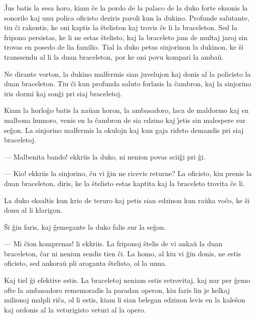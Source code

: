    \^Jus batis la sesa horo, kiam \^ce la pordo de la palaco de la duko
forte eksonis la sonorilo kaj unu polica oficisto deziris paroli kun
la dukino. Profunde salutante, tiu \^ci rakontis, ke oni kaptis la
\^steliston kaj trovis \^ce li la braceleton. Sed la fripono
persistas, ke li ne estas \^stelisto, kaj la braceleto jam de multaj
jaroj sin trovas en posedo de lia familio. Tial la duko petas
sinjorinon la dukinon, ke \^si transsendu al li la duan braceleton,
por ke oni povu kompari la amba\u u.

   Ne dirante vorton, la dukino malfermis sian juvelujon kaj donis al la
policisto la duan braceleton. Tiu \^ci kun profunda saluto forlasis
la \^cambron, kaj la sinjorino iris dormi kaj son\^gi pri siaj
braceletoj.

   Kiam la horlo\^go batis la na\u uan horon, la ambasadoro, laca de
maldormo kaj en malbona humoro, venis en la \^cambron de sia edzino
kaj \^{\j}etis sin malespere sur se\^gon. La sinjorino malfermis la
okulojn kaj kun gaja rideto demandis pri siaj braceletoj.

 --- Malbenita bando! ekkriis la duko, ni nenion povas scii\^gi pri \^gi.

 --- Kio! ekkriis la sinjorino, \^cu vi \^gin ne ricevis returne? La
oficisto, kiu prenis la duan braceleton, diris, ke la \^stelisto
estas kaptita kaj la braceleto trovita \^ce li.

   La duko eksaltis kun krio de teruro kaj petis sian edzinon kun ra\u uka
vo\^co, ke \^si donu al li klarigon.

   \^Si \^gin faris, kaj \^gemegante la duko falis sur la se\^gon.

 --- Mi \^cion komprenas! li ekkriis. La friponoj \^stelis de vi anka\u u
la duan braceleton, \^car ni neniun sendis tien \^ci. La homo, al
kiu vi \^gin donis, ne estis oficisto, sed ankora\u u pli aroganta
\^stelisto, ol la unua.

   Kaj tiel \^gi efektive estis. La braceletoj neniam estis retrovitaj,
kaj nur per \^gemo ofte la ambasadoro rememoradis la paradan operon,
kiu faris lin je kelkaj milionoj malpli ri\^ca, ol li estis, kiam li
sian belegan edzinon levis en la kale\^son kaj ordonis al la
veturigisto veturi al la opero.

\smallrule{}
